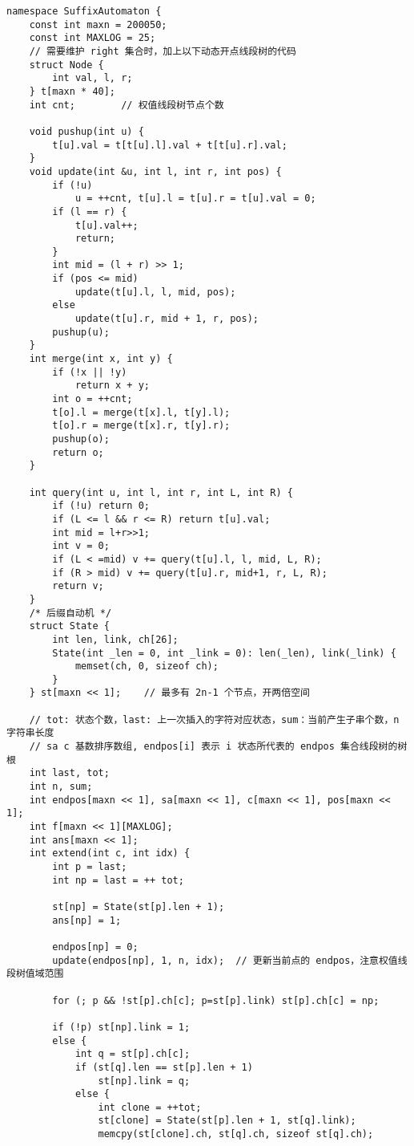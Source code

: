 \begin{verbatim}
namespace SuffixAutomaton {
    const int maxn = 200050;
    const int MAXLOG = 25;
    // 需要维护 right 集合时，加上以下动态开点线段树的代码
    struct Node {
        int val, l, r;
    } t[maxn * 40];
    int cnt;        // 权值线段树节点个数

    void pushup(int u) {
        t[u].val = t[t[u].l].val + t[t[u].r].val;
    }
    void update(int &u, int l, int r, int pos) {
        if (!u)
            u = ++cnt, t[u].l = t[u].r = t[u].val = 0;
        if (l == r) {
            t[u].val++;
            return;
        }
        int mid = (l + r) >> 1;
        if (pos <= mid)
            update(t[u].l, l, mid, pos);
        else
            update(t[u].r, mid + 1, r, pos);
        pushup(u);
    }
    int merge(int x, int y) {
        if (!x || !y)
            return x + y;
        int o = ++cnt;
        t[o].l = merge(t[x].l, t[y].l);
        t[o].r = merge(t[x].r, t[y].r);
        pushup(o);
        return o;
    }

    int query(int u, int l, int r, int L, int R) {
        if (!u) return 0;
        if (L <= l && r <= R) return t[u].val;
        int mid = l+r>>1;
        int v = 0;
        if (L < =mid) v += query(t[u].l, l, mid, L, R);
        if (R > mid) v += query(t[u].r, mid+1, r, L, R);
        return v;
    }
    /* 后缀自动机 */
    struct State {
        int len, link, ch[26];
        State(int _len = 0, int _link = 0): len(_len), link(_link) {
            memset(ch, 0, sizeof ch);
        }
    } st[maxn << 1];    // 最多有 2n-1 个节点，开两倍空间

    // tot: 状态个数，last: 上一次插入的字符对应状态，sum：当前产生子串个数，n 字符串长度
    // sa c 基数排序数组, endpos[i] 表示 i 状态所代表的 endpos 集合线段树的树根
    int last, tot;
    int n, sum;
    int endpos[maxn << 1], sa[maxn << 1], c[maxn << 1], pos[maxn << 1];
    int f[maxn << 1][MAXLOG];
    int ans[maxn << 1];
    int extend(int c, int idx) {
        int p = last;
        int np = last = ++ tot;
        
        st[np] = State(st[p].len + 1);
        ans[np] = 1;

        endpos[np] = 0;
        update(endpos[np], 1, n, idx);  // 更新当前点的 endpos，注意权值线段树值域范围

        for (; p && !st[p].ch[c]; p=st[p].link) st[p].ch[c] = np;
        
        if (!p) st[np].link = 1;
        else {
            int q = st[p].ch[c];
            if (st[q].len == st[p].len + 1)
                st[np].link = q;
            else {
                int clone = ++tot;
                st[clone] = State(st[p].len + 1, st[q].link);
                memcpy(st[clone].ch, st[q].ch, sizeof st[q].ch);
                

\end{verbatim}
